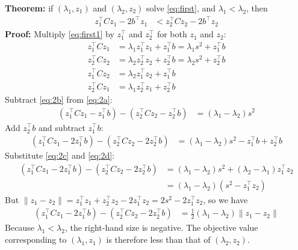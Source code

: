 \documentclass[10pt,letterpaper]{article}
\begin{document}
\textbf{Theorem:} if $(\lambda_1,z_1)$ and $(\lambda_2,z_2)$ solve \eqref{eq:first}, and $\lambda_1 < \lambda_2$, then
\begin{align*}
z_1^\top C z_1 - 2b^\top z_1 &< z_2^\top C z_2 - 2b^\top z_2
\end{align*}
\textbf{Proof:} Multiply \eqref{eq:first1} by $z_1^\top$ and $z_2^\top$ for both $z_1$ and $z_2$:
\begin{subequations}
\begin{align}
\label{eq:2a}z_1^\top C z_1 &= \lambda_1z_1^\top z_1 + z_1^\top b = \lambda_1 s^2 + z_1^\top b \\
\label{eq:2b}z_2^\top C z_2 &= \lambda_2z_2^\top z_2 + z_2^\top b = \lambda_2 s^2 + z_2^\top b \\
\label{eq:2c}z_1^\top C z_2 &= \lambda_2z_1^\top z_2 + z_1^\top b \\
\label{eq:2d}z_2^\top C z_1 &= \lambda_1z_2^\top z_1 + z_2^\top b
\end{align}
\end{subequations}
Subtract \eqref{eq:2b} from \eqref{eq:2a}:
\begin{align*}
(z_1^\top C z_1 - z_1^\top b) - (z_2^\top C z_2 - z_2^\top b) &= (\lambda_1 - \lambda_2)s^2
\end{align*}
Add $z_2^\top b$ and subtract $z_1^\top b$:
\begin{align*}
(z_1^\top C z_1 - 2z_1^\top b) - (z_2^\top C z_2 - 2z_2^\top b) &= (\lambda_1 - \lambda_2)s^2 - z_1^\top b + z_2^\top b
\end{align*}
Substitute \eqref{eq:2c} and \eqref{eq:2d}:
\begin{align*}
(z_1^\top C z_1 - 2z_1^\top b) - (z_2^\top C z_2 - 2z_2^\top b) &= (\lambda_1 - \lambda_2)s^2 + (\lambda_2 - \lambda_1) z_1^\top z_2 \\
&=  (\lambda_1 - \lambda_2)(s^2 - z_1^\top z_2)
\end{align*}
But $\lVert z_1 - z_2 \rVert = z_1^\top z_1 + z_2^\top z_2 - 2z_1^\top z_2 = 2s^2 - 2z_1^\top z_2$, so we have
\begin{align*}
(z_1^\top C z_1 - 2z_1^\top b) - (z_2^\top C z_2 - 2z_2^\top b) &= \frac{1}{2}(\lambda_1 - \lambda_2)\lVert z_1 - z_2 \rVert
\end{align*}
Because $\lambda_1 < \lambda_2$, the right-hand size is negative. The objective value corresponding to $(\lambda_1,z_1)$ is therefore less than that of $(\lambda_2,z_2)$.
 
\end{document}
